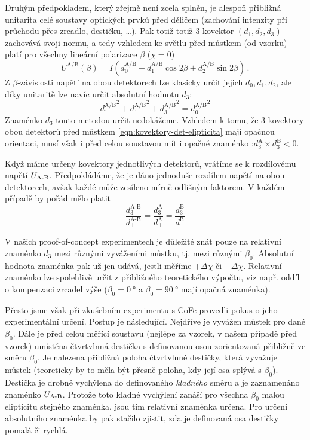 Druhým předpokladem, který zřejmě není zcela splněn, je alespoň přibližná unitarita celé soustavy optických prvků před děličem (zachování intenzity při průchodu přes zrcadlo, destičku, \ldots).
Pak totiž totiž 3-kovektor $(d_1, d_2, d_3)$ zachovává svoji normu, a tedy vzhledem ke světlu před můstkem (od vzorku) platí pro všechny lineární polarizace $\beta$ ($\chi=0$)
\begin{equation}
    U^\textrm{A/B}(\beta) = I \left( d^\textrm{A/B}_0 + d^\textrm{A/B}_1 \cos2\beta + d^\textrm{A/B}_2 \sin2\beta  \right) \,.
\end{equation}
Z $\beta$-závislosti napětí na obou detektorech lze klasicky určit jejich $d_0, d_1, d_2$, ale díky unitaritě lze navíc určit absolutní hodnotu $d_3$:
\begin{equation}
{d_1^\textrm{A/B}}^2 +  {d_1^\textrm{A/B}}^2 + {d_3^\textrm{A/B}}^2 = {d_0^\textrm{A/B}}^2
\end{equation}
Znaménko $d_3$ touto metodou určit nedokážeme.
Vzhledem k tomu, že 3-kovektory obou detektorů před můstkem \eqref{eqn:kovektory-det-elipticita} mají opačnou orientaci, musí však i před celou soustavou mít i opačné znaménko :$d^\textrm{A}_3 \times d^\textrm{B}_3 < 0$.

Když máme určeny kovektory jednotlivých detektorů, vrátíme se k rozdílovému napětí $U_\textrm{A-B}$.
Předpokládáme, že je dáno jednoduše rozdílem napětí na obou detektorech, avšak každé může zesíleno mírně odlišným faktorem.
V každém případě by pořád mělo platit
\begin{equation}
    \frac{d^\textrm{A-B}_3}{d^\textrm{A-B}_\perp} = \frac{d^\textrm{A}_3}{d^\textrm{A}_\perp} = \frac{d^\textrm{B}_3}{d^\textrm{B}_\perp}
\end{equation}




V našich proof-of-concept experimentech je důležité znát pouze na relativní znaménko $d_3$ mezi různými vyváženími můstku, tj. mezi různými $\beta_0$.
Absolutní hodnota znaménka pak už jen udává, jestli měříme $+\Delta\chi$ či $-\Delta\chi$.
Relativní znaménko lze spolehlivě určit z přibližného teoretického výpočtu, viz např. oddíl o kompenzaci zrcadel výše ($\beta_0=\SI{0}{\degree}$ a $\beta_0=\SI{90}{\degree}$ mají opačná znaménka).

Přesto jsme však při zkušebním experimentu s CoFe provedli pokus o jeho experimentální určení.
Postup je následující.
Nejdříve je vyvážen můstek pro dané $\beta_0$.
Dále je před celou měřící soustavu (nejlépe za vzorek, v našem případě před vzorek) umístěna čtvrtvlnná destička s definovanou osou zorientovaná přibližně ve směru $\beta_0$.
Je nalezena přibližná poloha čtvrtvlnné destičky, která vyvažuje můstek (teoreticky by to měla být přesně poloha, kdy její osa splývá s $\beta_0$).
Destička je drobně vychýlena do definovaného \emph{kladného} směru a je zaznamenáno znaménko $U_\textrm{A-B}$.
Protože toto kladné vychýlení zanáší pro všechna $\beta_0$ malou elipticitu stejného znaménka, jsou tím relativní znaménka určena.
Pro určení absolutního znaménka by pak stačilo zjistit, zda je definovaná osa destičky pomalá či rychlá.





